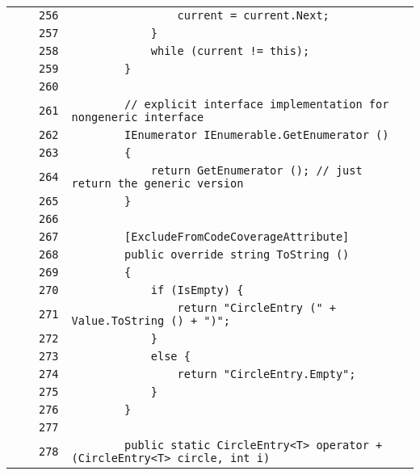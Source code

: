 \documentclass[a4paper,10pt]{article}
\begin{document}
\begin{longtable}[l]{lrrl}
\cellcolor{gray} &  & \verb~256~ & \verb~                current = current.Next;~\\
\cellcolor{gray} &  & \verb~257~ & \verb~            }~\\
\cellcolor{gray} &  & \verb~258~ & \verb~            while (current != this);~\\
\cellcolor{gray} &  & \verb~259~ & \verb~        }~\\
\cellcolor{gray} &  & \verb~260~ & \verb~~\\
\cellcolor{gray} &  & \verb~261~ & \verb~        // explicit interface implementation for nongeneric interface~\\
\cellcolor{gray} &  & \verb~262~ & \verb~        IEnumerator IEnumerable.GetEnumerator ()~\\
\cellcolor{gray} &  & \verb~263~ & \verb~        {~\\
\cellcolor{gray} &  & \verb~264~ & \verb~            return GetEnumerator (); // just return the generic version~\\
\cellcolor{gray} &  & \verb~265~ & \verb~        }~\\
\cellcolor{gray} &  & \verb~266~ & \verb~~\\
\cellcolor{gray} &  & \verb~267~ & \verb~        [ExcludeFromCodeCoverageAttribute]~\\
\cellcolor{gray} &  & \verb~268~ & \verb~        public override string ToString ()~\\
\cellcolor{gray} &  & \verb~269~ & \verb~        {~\\
\cellcolor{gray} &  & \verb~270~ & \verb~            if (IsEmpty) {~\\
\cellcolor{gray} &  & \verb~271~ & \verb~                return "CircleEntry (" + Value.ToString () + ")";~\\
\cellcolor{gray} &  & \verb~272~ & \verb~            }~\\
\cellcolor{gray} &  & \verb~273~ & \verb~            else {~\\
\cellcolor{gray} &  & \verb~274~ & \verb~                return "CircleEntry.Empty";~\\
\cellcolor{gray} &  & \verb~275~ & \verb~            }~\\
\cellcolor{gray} &  & \verb~276~ & \verb~        }~\\
\cellcolor{gray} &  & \verb~277~ & \verb~~\\
\cellcolor{gray} &  & \verb~278~ & \verb~        public static CircleEntry<T> operator + (CircleEntry<T> circle, int i)~\\

\end{longtable}
\end{document}
